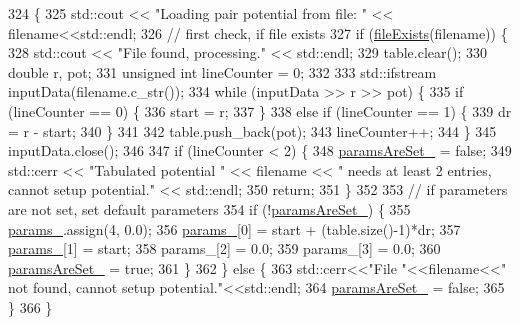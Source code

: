 \begin{DoxyCode}
324                                                 \{
325     std::cout << \textcolor{stringliteral}{"Loading pair potential from file: "} << filename<<std::endl;
326     \textcolor{comment}{// first check, if file exists}
327     \textcolor{keywordflow}{if} (\hyperlink{utilities_8cpp_a9d1e3672fd331d4185c1763c80226307}{fileExists}(filename)) \{
328         std::cout << \textcolor{stringliteral}{"File found, processing."} << std::endl;
329         table.clear();
330         \textcolor{keywordtype}{double} r, pot;
331         \textcolor{keywordtype}{unsigned} \textcolor{keywordtype}{int} lineCounter = 0;
332 
333         std::ifstream inputData(filename.c\_str());
334         \textcolor{keywordflow}{while} (inputData >> r >> pot) \{
335             \textcolor{keywordflow}{if} (lineCounter == 0) \{
336                 start = r;
337             \}
338             \textcolor{keywordflow}{else} \textcolor{keywordflow}{if} (lineCounter == 1) \{
339                 dr = r - start;
340             \}
341 
342             table.push\_back(pot);
343             lineCounter++;
344         \}
345         inputData.close();
346 
347         \textcolor{keywordflow}{if} (lineCounter < 2) \{
348             \hyperlink{classpair_potential_a635755c0a952bfc05a4cfae230c3dbd2}{paramsAreSet\_} = \textcolor{keyword}{false};
349             std::cerr << \textcolor{stringliteral}{"Tabulated potential "} << filename << \textcolor{stringliteral}{" needs at least 2 entries, cannot setup
       potential."} << std::endl;
350             \textcolor{keywordflow}{return};
351         \}
352 
353         \textcolor{comment}{// if parameters are not set, set default parameters}
354         \textcolor{keywordflow}{if} (!\hyperlink{classpair_potential_a635755c0a952bfc05a4cfae230c3dbd2}{paramsAreSet\_}) \{
355             \hyperlink{classpair_potential_abf8ec8af983d6e9960bd149da099e883}{params\_}.assign(4, 0.0);
356             \hyperlink{classpair_potential_abf8ec8af983d6e9960bd149da099e883}{params\_}[0] = start + (table.size()-1)*dr;
357             \hyperlink{classpair_potential_abf8ec8af983d6e9960bd149da099e883}{params\_}[1] = start;
358             params\_[2] = 0.0;
359             params\_[3] = 0.0;
360             \hyperlink{classpair_potential_a635755c0a952bfc05a4cfae230c3dbd2}{paramsAreSet\_} = \textcolor{keyword}{true};
361         \}
362     \} \textcolor{keywordflow}{else} \{
363         std::cerr<<\textcolor{stringliteral}{"File "}<<filename<<\textcolor{stringliteral}{" not found, cannot setup potential."}<<std::endl;
364         \hyperlink{classpair_potential_a635755c0a952bfc05a4cfae230c3dbd2}{paramsAreSet\_} = \textcolor{keyword}{false};
365     \}
366 \}
\end{DoxyCode}
